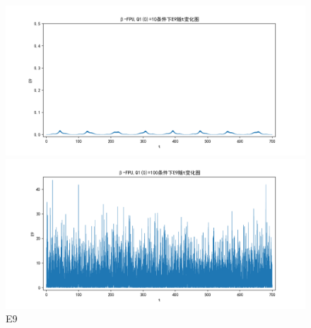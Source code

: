 \documentclass[10pt, a4paper]{article}
\begin{document}
    \begin{figure}[H]
        \begin{minipage}[t]{0.49\textwidth}
            \centering
            \includegraphics[width=\textwidth]{./q6_pics/cmp/E9.png}
        \end{minipage}
        \begin{minipage}[t]{0.49\textwidth}
            \centering
            \includegraphics[width=\textwidth]{./q6_pics/exp/E9.png}
        \end{minipage}
        \caption{E9}\label{fig:E9 in q6}
    \end{figure}
\end{document}
